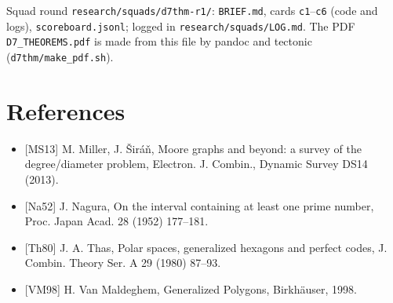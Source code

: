 \documentclass[
  10pt,
]{article}
\providecommand{\tightlist}{%
  \setlength{\itemsep}{0pt}\setlength{\parskip}{0pt}}
\begin{document}
Squad round \texttt{research/squads/d7thm-r1/}: \texttt{BRIEF.md}, cards
\texttt{c1}--\texttt{c6} (code and logs), \texttt{scoreboard.jsonl};
logged in \texttt{research/squads/LOG.md}. The PDF
\texttt{D7\_THEOREMS.pdf} is made from this file by pandoc and tectonic
(\texttt{d7thm/make\_pdf.sh}).

\hypertarget{references}{%
\section{References}\label{references}}

\begin{itemize}
\tightlist
\item
  {[}MS13{]} M. Miller, J. Širáň, Moore graphs and beyond: a survey of
  the degree/diameter problem, Electron. J. Combin., Dynamic Survey DS14
  (2013).
\item
  {[}Na52{]} J. Nagura, On the interval containing at least one prime
  number, Proc. Japan Acad. 28 (1952) 177--181.
\item
  {[}Th80{]} J. A. Thas, Polar spaces, generalized hexagons and perfect
  codes, J. Combin. Theory Ser. A 29 (1980) 87--93.
\item
  {[}VM98{]} H. Van Maldeghem, Generalized Polygons, Birkhäuser, 1998.
\end{itemize}
\end{document}
